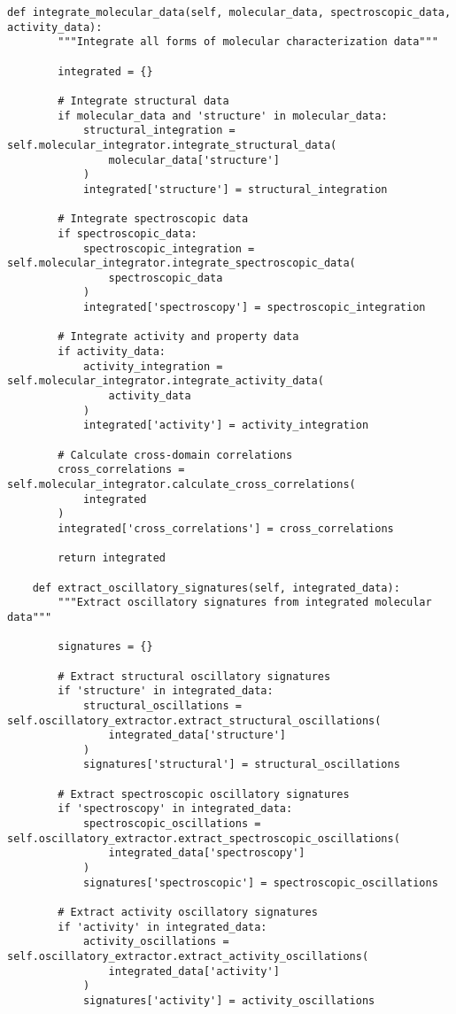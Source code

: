 \documentclass[12pt,a4paper]{article}
\begin{document}
\begin{lstlisting}[style=pythonstyle, caption=Core Molecular-to-Computer Vision Transformation Implementation]
    def integrate_molecular_data(self, molecular_data, spectroscopic_data, activity_data):
        """Integrate all forms of molecular characterization data"""

        integrated = {}

        # Integrate structural data
        if molecular_data and 'structure' in molecular_data:
            structural_integration = self.molecular_integrator.integrate_structural_data(
                molecular_data['structure']
            )
            integrated['structure'] = structural_integration

        # Integrate spectroscopic data
        if spectroscopic_data:
            spectroscopic_integration = self.molecular_integrator.integrate_spectroscopic_data(
                spectroscopic_data
            )
            integrated['spectroscopy'] = spectroscopic_integration

        # Integrate activity and property data
        if activity_data:
            activity_integration = self.molecular_integrator.integrate_activity_data(
                activity_data
            )
            integrated['activity'] = activity_integration

        # Calculate cross-domain correlations
        cross_correlations = self.molecular_integrator.calculate_cross_correlations(
            integrated
        )
        integrated['cross_correlations'] = cross_correlations

        return integrated

    def extract_oscillatory_signatures(self, integrated_data):
        """Extract oscillatory signatures from integrated molecular data"""

        signatures = {}

        # Extract structural oscillatory signatures
        if 'structure' in integrated_data:
            structural_oscillations = self.oscillatory_extractor.extract_structural_oscillations(
                integrated_data['structure']
            )
            signatures['structural'] = structural_oscillations

        # Extract spectroscopic oscillatory signatures
        if 'spectroscopy' in integrated_data:
            spectroscopic_oscillations = self.oscillatory_extractor.extract_spectroscopic_oscillations(
                integrated_data['spectroscopy']
            )
            signatures['spectroscopic'] = spectroscopic_oscillations

        # Extract activity oscillatory signatures
        if 'activity' in integrated_data:
            activity_oscillations = self.oscillatory_extractor.extract_activity_oscillations(
                integrated_data['activity']
            )
            signatures['activity'] = activity_oscillations


\end{lstlisting}
\end{document}
